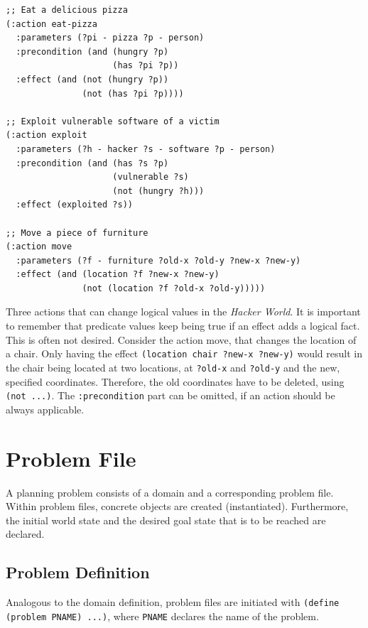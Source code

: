 \documentclass[a4paper,12pt]{report}
\begin{document}
\begin{listing}[H]
\begin{verbatim}
;; Eat a delicious pizza
(:action eat-pizza
  :parameters (?pi - pizza ?p - person)
  :precondition (and (hungry ?p)
                     (has ?pi ?p))
  :effect (and (not (hungry ?p))
               (not (has ?pi ?p))))

;; Exploit vulnerable software of a victim
(:action exploit        
  :parameters (?h - hacker ?s - software ?p - person)
  :precondition (and (has ?s ?p)
                     (vulnerable ?s)
                     (not (hungry ?h)))
  :effect (exploited ?s))

;; Move a piece of furniture
(:action move
  :parameters (?f - furniture ?old-x ?old-y ?new-x ?new-y)
  :effect (and (location ?f ?new-x ?new-y)
               (not (location ?f ?old-x ?old-y)))))
\end{verbatim}
\caption{Three actions that can change logical values in the \emph{Hacker World}. It is important to remember that predicate values keep being true if an effect adds a logical fact. This is often not desired. Consider the action move, that changes the location of a chair. Only having the effect \texttt{(location chair ?new-x ?new-y)} would result in the chair being located at two locations, at \texttt{?old-x} and \texttt{?old-y} and the new, specified coordinates. Therefore, the old coordinates have to be deleted, using \texttt{(not ...)}. The \texttt{:precondition} part can be omitted, if an action should be always applicable.}
\end{listing}
\section{Problem File}
\label{sec-2-3}

A planning problem consists of a domain and a corresponding problem
file. Within problem files, concrete objects are created
(instantiated). Furthermore, the initial world state and the desired
goal state that is to be reached are declared.

\subsection{Problem Definition}
\label{sec-2-3-1}

Analogous to the domain definition, problem files are initiated with
\texttt{(define (problem PNAME) ...)}, where \texttt{PNAME} declares the name of the
problem.
\end{document}
